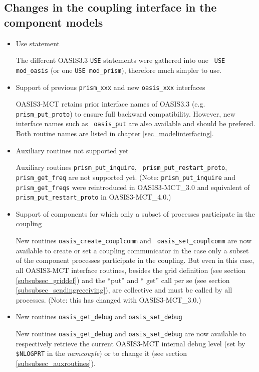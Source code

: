 \subsection{Changes in the coupling interface in the component models}
\label{sec_changes_API}

\begin{itemize}

\item Use statement

The different OASIS3.3 {\tt USE} statements were gathered into one {\tt
  USE mod\_oasis} (or one {\tt USE mod\_prism}), therefore much
  simpler to use.

\item Support of previous {\tt prism\_xxx} and new {\tt oasis\_xxx}
  interfaces

OASIS3-MCT retains prior interface names of OASIS3.3
  (e.g. {\tt prism\_put\_proto}) to ensure full backward
  compatibility. However, new interface names such as {\tt
    oasis\_put} are also available and should be prefered. Both
  routine names are listed in chapter \ref{sec_modelinterfacing}.

\item Auxiliary routines not supported yet

Auxiliary routines {\tt prism\_put\_inquire}, {\tt
  prism\_put\_restart\_proto}, {\tt prism\_get\_freq} are not
  supported yet. (Note: {\tt prism\_put\_inquire} and {\tt prism\_get\_freqs} were  reintroduced in OASIS3-MCT\_3.0 and equivalent of  {\tt
  prism\_put\_restart\_proto} in OASIS3-MCT\_4.0.)

\item Support of components for which only a subset of processes
  participate in the coupling

New routines {\tt oasis\_create\_couplcomm} and {\tt
  oasis\_set\_couplcomm} are now available to create or set a coupling
  communicator in the case only a subset of the component processes
  participate in the coupling. But
  even in this case, all OASIS3-MCT interface routines, besides the
  grid definition (see section \ref{subsubsec_griddef}) and the
  ``put'' and `` get'' call per se (see section
  \ref{subsubsec_sendingreceiving}), are collective and must be called
  by all processes. (Note: this has changed with OASIS3-MCT\_3.0.)

\item New routines {\tt oasis\_get\_debug} and {\tt oasis\_set\_debug}

New routines {\tt oasis\_get\_debug} and {\tt oasis\_set\_debug}
  are now available to respectively retrieve the current OASIS3-MCT
  internal debug level (set by {\tt \$NLOGPRT} in the {\it namcouple}) or to change it (see section
  \ref{subsubsec_auxroutines}).

\end{itemize}

